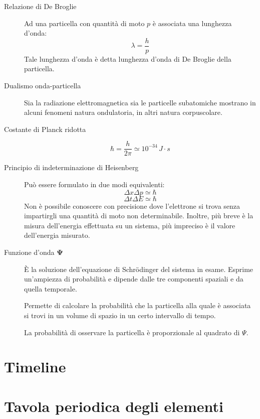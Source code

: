 \documentclass[a4paper,11pt,italian]{article}
\begin{document}
\begin{description}
  \item[Relazione di De Broglie] 
  Ad una particella con quantità di moto $ p $ è associata una lunghezza d'onda:
  \[ \lambda = \frac{h}{p} \] Tale lunghezza d'onda è detta lunghezza d'onda di De Broglie della particella.
  
  \item[Dualismo onda-particella] 
  Sia la radiazione elettromagnetica sia le particelle subatomiche mostrano in alcuni fenomeni natura ondulatoria, in altri natura corpuscolare.
  
  \item[Costante di Planck ridotta] 
  \[ \hbar = \frac{h}{2 \pi} \simeq 10^{-34} \, J\cdot s \]
  
  \item[Principio di indeterminazione di Heisenberg] 
  Può essere formulato in due modi equivalenti: 
  \[ \Delta x \Delta p \simeq \hbar \]
  \[ \Delta t \Delta E \simeq \hbar \]
  Non è possibile conoscere con precisione dove l'elettrone si trova senza impartirgli una quantità di moto non determinabile. Inoltre, più breve è la misura dell'energia effettuata su un sistema, più impreciso è il valore dell'energia misurato.
  
  \item[Funzione d'onda $ \mathbf{\Psi} $]
  È la soluzione dell'equazione di Schrödinger del sistema in esame. Esprime un'ampiezza di probabilità e dipende dalle tre componenti spaziali e da quella temporale.
  
  Permette di calcolare la probabilità che la particella alla quale è associata si trovi in un volume di spazio in un certo intervallo di tempo.
  
  La probabilità di osservare la particella è proporzionale al quadrato di $ \Psi $.
\end{description}


\newpage
\section{Timeline}
\begin{turn}{90}
\begin{minipage}{\linewidth}
\scalebox{.66}{}
\end{minipage}
\end{turn}

\newpage
\section{Tavola periodica degli elementi}

\end{document}
